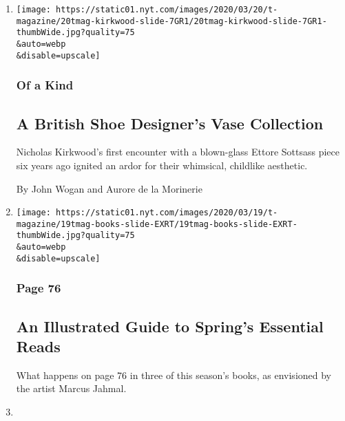 \begin{enumerate}
\def\labelenumi{\arabic{enumi}.}
\item
  \href{/2020/03/20/t-magazine/nicholas-kirkwood-ettore-sottsass.html}{}

  \texttt{[image: https://static01.nyt.com/images/2020/03/20/t-magazine/20tmag-kirkwood-slide-7GR1/20tmag-kirkwood-slide-7GR1-thumbWide.jpg?quality=75\\\&auto=webp\\\&disable=upscale]}

  \hypertarget{of-a-kind}{%
  \subsubsection{Of a Kind}\label{of-a-kind}}

  \hypertarget{a-british-shoe-designers-vase-collection}{%
  \subsection{A British Shoe Designer's Vase
  Collection}\label{a-british-shoe-designers-vase-collection}}

  Nicholas Kirkwood's first encounter with a blown-glass Ettore Sottsass
  piece six years ago ignited an ardor for their whimsical, childlike
  aesthetic.

  By John Wogan and Aurore de la Morinerie
\item
  \href{/2020/03/19/t-magazine/spring-books-marcus-jahmal.html}{}

  \texttt{[image: https://static01.nyt.com/images/2020/03/19/t-magazine/19tmag-books-slide-EXRT/19tmag-books-slide-EXRT-thumbWide.jpg?quality=75\\\&auto=webp\\\&disable=upscale]}

  \hypertarget{page-76}{%
  \subsubsection{Page 76}\label{page-76}}

  \hypertarget{an-illustrated-guide-to-springs-essential-reads}{%
  \subsection{An Illustrated Guide to Spring's Essential
  Reads}\label{an-illustrated-guide-to-springs-essential-reads}}

  What happens on page 76 in three of this season's books, as envisioned
  by the artist Marcus Jahmal.
\item
  \href{/2020/03/19/t-magazine/ts-spring-design-issue.html}{}


\end{enumerate}
